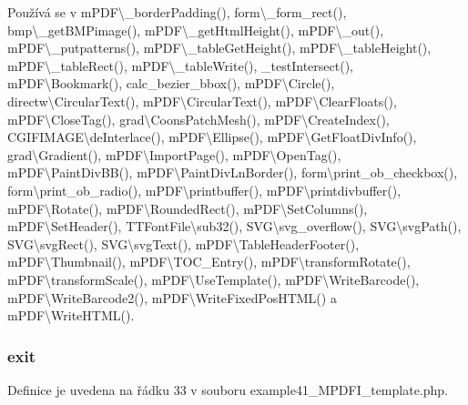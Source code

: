Používá se v m\-P\-D\-F\textbackslash{}\-\_\-border\-Padding(), form\textbackslash{}\-\_\-form\-\_\-rect(), bmp\textbackslash{}\-\_\-get\-B\-M\-Pimage(), m\-P\-D\-F\textbackslash{}\-\_\-get\-Html\-Height(), m\-P\-D\-F\textbackslash{}\-\_\-out(), m\-P\-D\-F\textbackslash{}\-\_\-putpatterns(), m\-P\-D\-F\textbackslash{}\-\_\-table\-Get\-Height(), m\-P\-D\-F\textbackslash{}\-\_\-table\-Height(), m\-P\-D\-F\textbackslash{}\-\_\-table\-Rect(), m\-P\-D\-F\textbackslash{}\-\_\-table\-Write(), \-\_\-test\-Intersect(), m\-P\-D\-F\textbackslash{}\-Bookmark(), calc\-\_\-bezier\-\_\-bbox(), m\-P\-D\-F\textbackslash{}\-Circle(), directw\textbackslash{}\-Circular\-Text(), m\-P\-D\-F\textbackslash{}\-Circular\-Text(), m\-P\-D\-F\textbackslash{}\-Clear\-Floats(), m\-P\-D\-F\textbackslash{}\-Close\-Tag(), grad\textbackslash{}\-Coons\-Patch\-Mesh(), m\-P\-D\-F\textbackslash{}\-Create\-Index(), C\-G\-I\-F\-I\-M\-A\-G\-E\textbackslash{}de\-Interlace(), m\-P\-D\-F\textbackslash{}\-Ellipse(), m\-P\-D\-F\textbackslash{}\-Get\-Float\-Div\-Info(), grad\textbackslash{}\-Gradient(), m\-P\-D\-F\textbackslash{}\-Import\-Page(), m\-P\-D\-F\textbackslash{}\-Open\-Tag(), m\-P\-D\-F\textbackslash{}\-Paint\-Div\-B\-B(), m\-P\-D\-F\textbackslash{}\-Paint\-Div\-Ln\-Border(), form\textbackslash{}print\-\_\-ob\-\_\-checkbox(), form\textbackslash{}print\-\_\-ob\-\_\-radio(), m\-P\-D\-F\textbackslash{}printbuffer(), m\-P\-D\-F\textbackslash{}printdivbuffer(), m\-P\-D\-F\textbackslash{}\-Rotate(), m\-P\-D\-F\textbackslash{}\-Rounded\-Rect(), m\-P\-D\-F\textbackslash{}\-Set\-Columns(), m\-P\-D\-F\textbackslash{}\-Set\-Header(), T\-T\-Font\-File\textbackslash{}sub32(), S\-V\-G\textbackslash{}svg\-\_\-overflow(), S\-V\-G\textbackslash{}svg\-Path(), S\-V\-G\textbackslash{}svg\-Rect(), S\-V\-G\textbackslash{}svg\-Text(), m\-P\-D\-F\textbackslash{}\-Table\-Header\-Footer(), m\-P\-D\-F\textbackslash{}\-Thumbnail(), m\-P\-D\-F\textbackslash{}\-T\-O\-C\-\_\-\-Entry(), m\-P\-D\-F\textbackslash{}transform\-Rotate(), m\-P\-D\-F\textbackslash{}transform\-Scale(), m\-P\-D\-F\textbackslash{}\-Use\-Template(), m\-P\-D\-F\textbackslash{}\-Write\-Barcode(), m\-P\-D\-F\textbackslash{}\-Write\-Barcode2(), m\-P\-D\-F\textbackslash{}\-Write\-Fixed\-Pos\-H\-T\-M\-L() a m\-P\-D\-F\textbackslash{}\-Write\-H\-T\-M\-L().

\hypertarget{example41___m_p_d_f_i__template_8php_a6733eb5f605d09eaede9845835d71c4e}{
\subsubsection[{exit}]{\setlength{\rightskip}{0pt plus 5cm}exit}}\label{example41___m_p_d_f_i__template_8php_a6733eb5f605d09eaede9845835d71c4e}


Definice je uvedena na řádku 33 v souboru example41\-\_\-\-M\-P\-D\-F\-I\-\_\-template.\-php.

